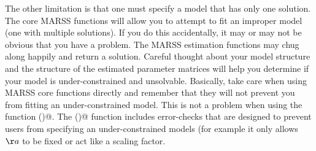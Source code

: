 The other limitation is that one must specify a model that has only one solution.  The core MARSS functions will allow you to attempt to fit an improper model (one with multiple solutions).  If you do this accidentally, it may or may not be obvious that you have a problem.  The MARSS estimation functions may chug along happily and return a solution.  Careful thought about your model structure and the structure of the estimated parameter matrices will help you determine if your model is under-constrained and unsolvable.  Basically, take care when using MARSS core functions directly and remember that they will not prevent you from fitting an under-constrained model.  This is not a problem when using the function \verb@MARSS()@.  The \verb@MARSS()@ function includes error-checks that are designed to prevent users from specifying an under-constrained models (for example it only allows $\aa$ to be fixed or act like a scaling factor.
